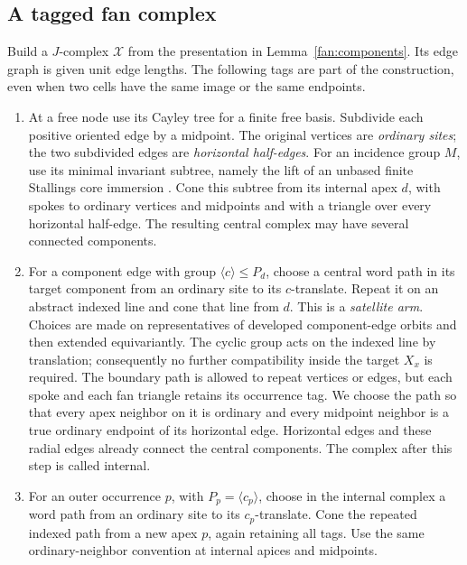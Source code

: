 \subsection{A tagged fan complex}

Build a $J$-complex $\mathcal X$ from the presentation in
Lemma~\ref{fan:components}.  Its edge graph is given unit edge lengths.
The following tags are part of the construction, even when two cells
have the same image or the same endpoints.

\begin{enumerate}[label=\textup{(\arabic*)}]
\item At a free node use its Cayley tree for a finite free basis.
Subdivide each positive oriented edge by a midpoint.  The original
vertices are \emph{ordinary sites}; the two subdivided edges are
\emph{horizontal half-edges}.  For an incidence group $M$, use its
minimal invariant subtree, namely the lift of an unbased finite
Stallings core immersion \cite[Sections~3, 5 and~7]{Stallings1983}.
Cone this subtree from its internal apex
$d$, with spokes to ordinary vertices and midpoints and with a triangle
over every horizontal half-edge.  The resulting central complex may
have several connected components.
\item For a component edge with group $\langle c\rangle\le P_d$, choose
a central word path in its target component from an ordinary site to
its $c$-translate.  Repeat it on an abstract indexed line and cone that
line from $d$.  This is a \emph{satellite arm}.  Choices are made on
representatives of developed component-edge orbits and then extended
equivariantly.  The cyclic group acts on the indexed line by
translation; consequently no further compatibility inside the target
$X_x$ is required.  The boundary path is allowed to repeat vertices or
edges, but each spoke and each fan triangle retains its occurrence tag.
We choose the path so that every apex neighbor on it is ordinary and
every midpoint neighbor is a true ordinary endpoint of its horizontal
edge.  Horizontal edges and these radial edges already connect the
central components.  The complex after this step is called internal.
\item For an outer occurrence $p$, with $P_p=\langle c_p\rangle$, choose
in the internal complex a word path from an ordinary site to its
$c_p$-translate.  Cone the repeated indexed path from a new apex $p$,
again retaining all tags.  Use the same ordinary-neighbor convention
at internal apices and midpoints.
\end{enumerate}

